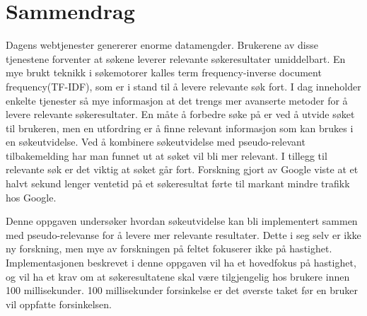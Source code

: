 \chapter*{Sammendrag}
Dagens webtjenester genererer enorme datamengder.
Brukerene av disse tjenestene forventer at søkene leverer relevante søkeresultater umiddelbart.
En mye brukt teknikk i søkemotorer kalles term frequency-inverse document frequency(TF-IDF),
som er i stand til å levere relevante søk fort.
I dag inneholder enkelte tjenester så mye informasjon at det trengs mer avanserte metoder for å levere relevante søkeresultater.
En måte å forbedre søke på er ved å utvide søket til brukeren,
men en utfordring er å finne relevant informasjon som kan brukes i en søkeutvidelse.
Ved å kombinere søkeutvidelse med pseudo-relevant tilbakemelding har man funnet ut at søket vil bli mer relevant.
I tillegg til relevante søk er det viktig at søket går fort.
Forskning gjort av Google \cite{google-marissa} viste at et halvt sekund lenger ventetid på et søkeresultat
førte til markant mindre trafikk hos Google.

Denne oppgaven undersøker hvordan søkeutvidelse kan bli implementert sammen med pseudo-relevanse
for å levere mer relevante resultater.
Dette i seg selv er ikke ny forskning,
men mye av forskningen på feltet fokuserer ikke på hastighet.
Implementasjonen beskrevet i denne oppgaven vil ha et hovedfokus på hastighet,
og vil ha et krav om at søkeresultatene skal være tilgjengelig hos brukere innen 100 millisekunder.
100 millisekunder forsinkelse er det øverste taket før en bruker vil oppfatte forsinkelsen.

